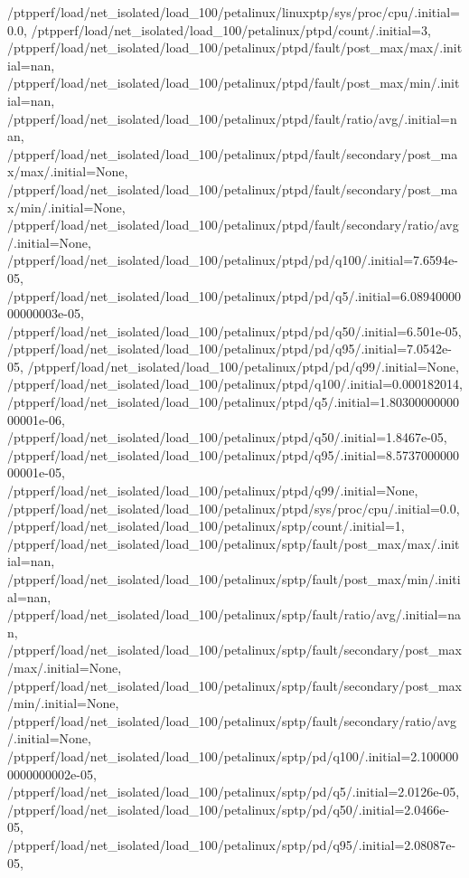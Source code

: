 {    /ptpperf/load/net_isolated/load_100/petalinux/linuxptp/sys/proc/cpu/.initial=0.0,
    /ptpperf/load/net_isolated/load_100/petalinux/ptpd/count/.initial=3,
    /ptpperf/load/net_isolated/load_100/petalinux/ptpd/fault/post_max/max/.initial=nan,
    /ptpperf/load/net_isolated/load_100/petalinux/ptpd/fault/post_max/min/.initial=nan,
    /ptpperf/load/net_isolated/load_100/petalinux/ptpd/fault/ratio/avg/.initial=nan,
    /ptpperf/load/net_isolated/load_100/petalinux/ptpd/fault/secondary/post_max/max/.initial=None,
    /ptpperf/load/net_isolated/load_100/petalinux/ptpd/fault/secondary/post_max/min/.initial=None,
    /ptpperf/load/net_isolated/load_100/petalinux/ptpd/fault/secondary/ratio/avg/.initial=None,
    /ptpperf/load/net_isolated/load_100/petalinux/ptpd/pd/q100/.initial=7.6594e-05,
    /ptpperf/load/net_isolated/load_100/petalinux/ptpd/pd/q5/.initial=6.0894000000000003e-05,
    /ptpperf/load/net_isolated/load_100/petalinux/ptpd/pd/q50/.initial=6.501e-05,
    /ptpperf/load/net_isolated/load_100/petalinux/ptpd/pd/q95/.initial=7.0542e-05,
    /ptpperf/load/net_isolated/load_100/petalinux/ptpd/pd/q99/.initial=None,
    /ptpperf/load/net_isolated/load_100/petalinux/ptpd/q100/.initial=0.000182014,
    /ptpperf/load/net_isolated/load_100/petalinux/ptpd/q5/.initial=1.8030000000000001e-06,
    /ptpperf/load/net_isolated/load_100/petalinux/ptpd/q50/.initial=1.8467e-05,
    /ptpperf/load/net_isolated/load_100/petalinux/ptpd/q95/.initial=8.573700000000001e-05,
    /ptpperf/load/net_isolated/load_100/petalinux/ptpd/q99/.initial=None,
    /ptpperf/load/net_isolated/load_100/petalinux/ptpd/sys/proc/cpu/.initial=0.0,
    /ptpperf/load/net_isolated/load_100/petalinux/sptp/count/.initial=1,
    /ptpperf/load/net_isolated/load_100/petalinux/sptp/fault/post_max/max/.initial=nan,
    /ptpperf/load/net_isolated/load_100/petalinux/sptp/fault/post_max/min/.initial=nan,
    /ptpperf/load/net_isolated/load_100/petalinux/sptp/fault/ratio/avg/.initial=nan,
    /ptpperf/load/net_isolated/load_100/petalinux/sptp/fault/secondary/post_max/max/.initial=None,
    /ptpperf/load/net_isolated/load_100/petalinux/sptp/fault/secondary/post_max/min/.initial=None,
    /ptpperf/load/net_isolated/load_100/petalinux/sptp/fault/secondary/ratio/avg/.initial=None,
    /ptpperf/load/net_isolated/load_100/petalinux/sptp/pd/q100/.initial=2.1000000000000002e-05,
    /ptpperf/load/net_isolated/load_100/petalinux/sptp/pd/q5/.initial=2.0126e-05,
    /ptpperf/load/net_isolated/load_100/petalinux/sptp/pd/q50/.initial=2.0466e-05,
    /ptpperf/load/net_isolated/load_100/petalinux/sptp/pd/q95/.initial=2.08087e-05,
}
